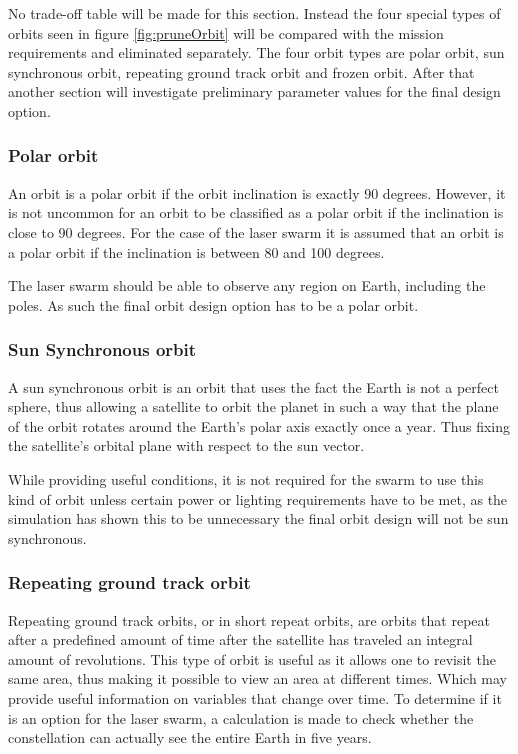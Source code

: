 No trade-off table will be made for this section. Instead the four special types of orbits seen in figure \ref{fig:pruneOrbit} will be compared with the mission requirements and eliminated separately. The four orbit types are polar orbit, sun synchronous orbit, repeating ground track orbit and frozen orbit. After that another section will investigate preliminary parameter values for the final design option.

\subsubsection{Polar orbit}
An orbit is a polar orbit if the orbit inclination is exactly 90 degrees. However, it is not uncommon for an orbit to be classified as a polar orbit if the inclination is close to 90 degrees. For the case of the laser swarm it is assumed that an orbit is a polar orbit if the inclination is between 80 and 100 degrees.

The laser swarm should be able to observe any region on Earth, including the poles. As such the final orbit design option has to be a polar orbit.

\subsubsection{Sun Synchronous orbit}
A sun synchronous orbit is an orbit that uses the fact the Earth is not a perfect sphere, thus allowing a satellite to orbit the planet in such a way that the plane of the orbit rotates around the Earth's polar axis exactly once a year. Thus fixing the satellite's orbital plane with respect to the sun vector.

While providing useful conditions, it is not required for the swarm to use this kind of orbit unless certain power or lighting requirements have to be met, as the simulation has shown this to be unnecessary the final orbit design will not be sun synchronous.

\subsubsection{Repeating ground track orbit}
Repeating ground track orbits, or in short repeat orbits, are orbits that repeat after a predefined amount of time after the satellite has traveled an integral amount of revolutions. This type of orbit is useful as it allows one to revisit the same area, thus making it possible to view an area at different times. Which may provide useful information on variables that change over time.
To determine if it is an option for the laser swarm, a calculation is made to check whether the constellation can actually see the entire Earth in five years.

